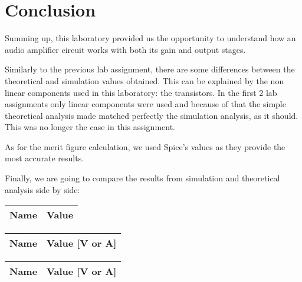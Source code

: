 \section{Conclusion}
\label{sec:conclusion}

Summing up, this laboratory provided us the opportunity to understand how an audio amplifier circuit works with both its gain and output stages.\par
Similarly to the previous lab assignment, there are some differences between the theoretical and simulation values obtained. This can be explained by the non linear components used in this laboratory: the transistors. In the first 2 lab assignments only linear components were used and because of that the simple theoretical analysis made matched perfectly the simulation analysis, as it should. This was no longer the case in this assignment. \par
As for the merit figure calculation, we used Spice's values as they provide the most accurate results. \par
Finally, we are going to compare the results from simulation and theoretical analysis side by side: \par

\begin{center}
  \begin{tabular}{ | c | c | }
    \hline    
    {\bf Name} & {\bf Value} \\ \hline
    \hline
  \end{tabular}
\end{center}

\begin{center}
  \begin{tabular}{ | c | c | }
    \hline    
    {\bf Name} & {\bf Value [V or A]} \\ \hline
  \end{tabular}
\end{center}

\begin{center}
  \begin{tabular}{ | c | c | }
    \hline    
    {\bf Name} & {\bf Value [V or A]} \\ \hline
    
  \end{tabular}
\end{center}

